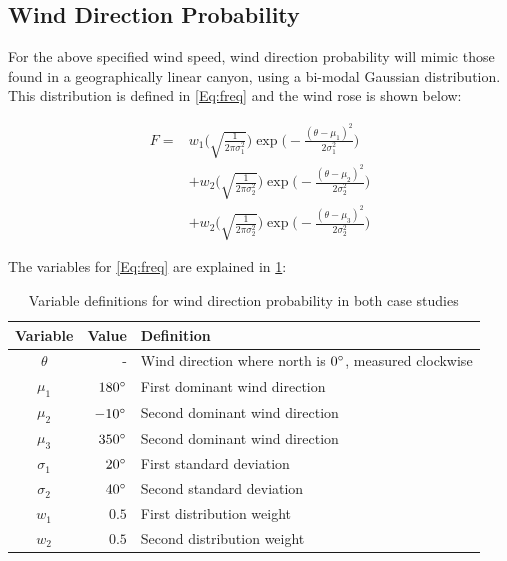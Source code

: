 \documentclass[12pt]{article}
\begin{document}
    \subsection{Wind Direction Probability}
    
        For the above specified wind speed, wind direction probability will mimic those found in a geographically linear canyon, using a bi-modal Gaussian distribution. This distribution is defined in  \cref{Eq:freq} and the wind rose is shown below: %
        
        \begin{align}
            F = &w_1\Bigg(\sqrt{\frac{1}{2 \pi \sigma_1^2}}\Bigg)\exp\Bigg(-\frac{(\theta-\mu_1)^2}{2 \sigma_1^2}\Bigg) \nonumber \\
            &+ w_2\Bigg(\sqrt{\frac{1}{2 \pi \sigma_2^2}}\Bigg)\exp\Bigg(-\frac{(\theta-\mu_2)^2}{2 \sigma_2^2}\Bigg) \nonumber \\
            &+ w_2\Bigg(\sqrt{\frac{1}{2 \pi \sigma_2^2}}\Bigg)\exp\Bigg(-\frac{(\theta-\mu_3)^2}{2 \sigma_2^2}\Bigg)
        \label{Eq:freq}
        \end{align}

    The variables for \cref{Eq:freq} are explained in \cref{tab:WindDirProb}:
        \begin{table}[H]
        \centering
        \begin{tabular}{|c|r|l|}
            \hline
             Variable & Value & Definition \\ \hline
            $\theta$ & - & Wind direction where north is $0 \degree$, measured clockwise \\ \hline
            $\mu_1$ & $180\degree$ & First dominant wind direction \\ \hline
            $\mu_2$ & $-10\degree$ & Second dominant wind direction \\ \hline
            $\mu_3$ & $350\degree$ & Second dominant wind direction \\ \hline
            $\sigma_1$ & $20 \degree$ & First standard deviation \\ \hline
            $\sigma_2$ & $40 \degree$ & Second standard deviation \\ \hline
            $w_1$ & $0.5$ & First distribution weight \\ \hline
            $w_2$ & $0.5$ & Second distribution weight \\ \hline
        \end{tabular}
        \caption{Variable definitions for wind direction probability in both case studies}
        \label{tab:WindDirProb}
        \end{table}
    
\end{document}
